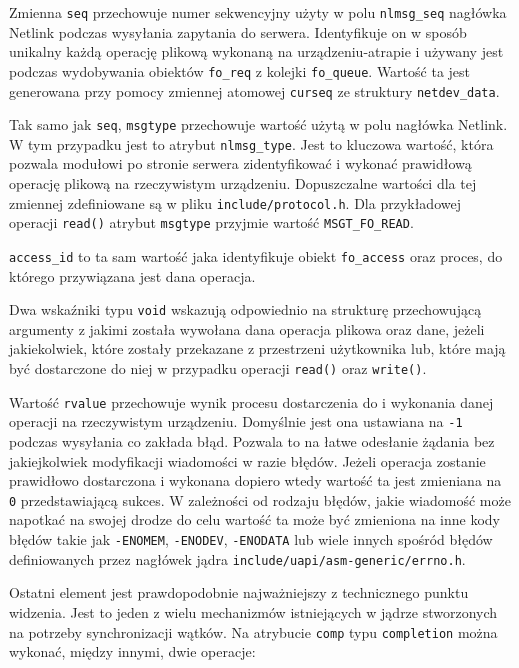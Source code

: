 \documentclass[11pt]{scrartcl}
\begin{document}
Zmienna \texttt{seq} przechowuje numer sekwencyjny użyty w polu \texttt{nlmsg\_seq} nagłówka Netlink podczas wysyłania zapytania do serwera.  Identyfikuje on w sposób unikalny każdą operację plikową wykonaną na urządzeniu-atrapie i używany jest podczas wydobywania obiektów \texttt{fo\_req} z kolejki \texttt{fo\_queue}. Wartość ta jest generowana przy pomocy zmiennej atomowej \texttt{curseq} ze struktury \texttt{netdev\_data}.

Tak samo jak \texttt{seq}, \texttt{msgtype} przechowuje wartość użytą w polu nagłówka Netlink. W tym przypadku jest to atrybut \texttt{nlmsg\_type}. Jest to kluczowa wartość, która pozwala modułowi po stronie serwera zidentyfikować i wykonać prawidłową operację plikową na rzeczywistym urządzeniu. Dopuszczalne wartości dla tej zmiennej zdefiniowane są w pliku \texttt{include/protocol.h}. Dla przykładowej operacji \texttt{read()} atrybut \texttt{msgtype} przyjmie wartość \texttt{MSGT\_FO\_READ}.

\texttt{access\_id} to ta sam wartość jaka identyfikuje obiekt \texttt{fo\_access} oraz proces, do którego przywiązana jest dana operacja.

Dwa wskaźniki typu \texttt{void} wskazują odpowiednio na strukturę przechowującą argumenty z jakimi została wywołana dana operacja plikowa oraz dane, jeżeli jakiekolwiek, które zostały przekazane z przestrzeni użytkownika lub, które mają być dostarczone do niej w przypadku operacji \texttt{read()} oraz \texttt{write()}.

Wartość \texttt{rvalue} przechowuje wynik procesu dostarczenia do i wykonania danej operacji na rzeczywistym urządzeniu. Domyślnie jest ona ustawiana na \texttt{-1} podczas wysyłania co zakłada błąd. Pozwala to na łatwe odesłanie żądania bez jakiejkolwiek modyfikacji wiadomości w razie błędów. Jeżeli operacja zostanie prawidłowo dostarczona i wykonana dopiero wtedy wartość ta jest zmieniana na \texttt{0} przedstawiającą sukces. W zależności od rodzaju błędów, jakie wiadomość może napotkać na swojej drodze do celu wartość ta może być zmieniona na inne kody błędów takie jak \texttt{-ENOMEM}, \texttt{-ENODEV}, \texttt{-ENODATA} lub wiele innych spośród błędów definiowanych przez nagłówek jądra \texttt{include/uapi/asm-generic/errno.h}.

Ostatni element jest prawdopodobnie najważniejszy z technicznego punktu widzenia. Jest to jeden z wielu mechanizmów istniejących w jądrze stworzonych na potrzeby synchronizacji wątków. Na atrybucie \texttt{comp} typu \texttt{completion} można wykonać, między innymi, dwie operacje:
\end{document}
